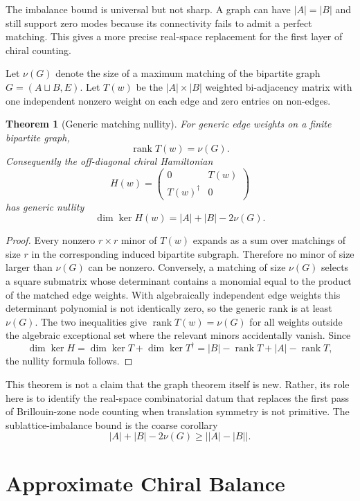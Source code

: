 \documentclass[11pt,a4paper]{article}
\newtheorem{theorem}{Theorem}
\begin{document}
The imbalance bound is universal but not sharp. A graph can have
$|A|=|B|$ and still support zero modes because its connectivity fails to admit
a perfect matching. This gives a more precise real-space replacement for the
first layer of chiral counting.

Let $\nu(G)$ denote the size of a maximum matching of the bipartite graph
$G=(A\sqcup B,E)$. Let $T(w)$ be the $|A|\times |B|$ weighted bi-adjacency
matrix with one independent nonzero weight on each edge and zero entries on
non-edges.

\begin{theorem}[Generic matching nullity]
For generic edge weights on a finite bipartite graph,
\[
  \operatorname{rank} T(w) = \nu(G).
\]
Consequently the off-diagonal chiral Hamiltonian
\[
  H(w)=
  \begin{pmatrix}
    0 & T(w)\\
    T(w)^\dagger & 0
  \end{pmatrix}
\]
has generic nullity
\[
  \dim\ker H(w)=|A|+|B|-2\nu(G).
\]
\end{theorem}

\begin{proof}
Every nonzero $r\times r$ minor of $T(w)$ expands as a sum over matchings of
size $r$ in the corresponding induced bipartite subgraph. Therefore no minor
of size larger than $\nu(G)$ can be nonzero. Conversely, a matching of size
$\nu(G)$ selects a square submatrix whose determinant contains a monomial equal
to the product of the matched edge weights. With algebraically independent
edge weights this determinant polynomial is not identically zero, so the
generic rank is at least $\nu(G)$. The two inequalities give
$\operatorname{rank}T(w)=\nu(G)$ for all weights outside the algebraic
exceptional set where the relevant minors accidentally vanish. Since
\[
  \dim\ker H = \dim\ker T+\dim\ker T^\dagger
             = |B|-\operatorname{rank}T + |A|-\operatorname{rank}T,
\]
the nullity formula follows.
\end{proof}

This theorem is not a claim that the graph theorem itself is new. Rather, its
role here is to identify the real-space combinatorial datum that replaces the
first pass of Brillouin-zone node counting when translation symmetry is not
primitive. The sublattice-imbalance bound is the coarse corollary
\[
  |A|+|B|-2\nu(G)\geq \big||A|-|B|\big|.
\]

\section{Approximate Chiral Balance}
\end{document}

